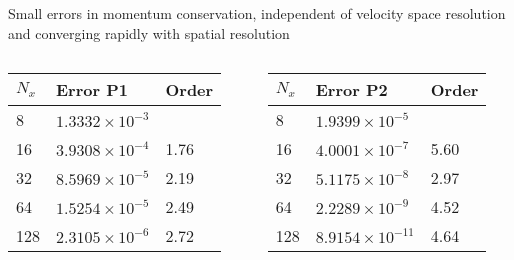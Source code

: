\documentclass[pdf]{beamer}
\theoremstyle{definition}
\begin{document}
\begin{frame}{Small errors in momentum conservation, independent of
    velocity space resolution and converging rapidly with spatial
    resolution}%

  \begin{columns}
    \begin{column}{0.5\textwidth}
      \begin{tabulary}{\linewidth}{|L|L|L|}
        \hline
        
          $N_x$
        & {
          Error P1
        } & {
          Order
        }\\
        & 
        $1.3332\times 10^{-3}$
        &  
        \\\hline
        
        16
        & 
        $3.9308\times 10^{-4}$
        & 
        1.76
        \\\hline
        
        32
        & 
        $8.5969\times 10^{-5}$
        & 
        2.19
        \\\hline
        
        64
        & 
        $1.5254\times 10^{-5}$
        & 
        2.49
        \\\hline
        
        128
        & 
        $2.3105\times 10^{-6}$
        & 
        2.72
        \\\hline
      \end{tabulary}
    \end{column}
    \begin{column}{0.5\textwidth}
      \begin{tabulary}{\linewidth}{|L|L|L|}
        \hline
        $N_x$
        & {
          Error P2
        } & {
          Order
        }\\
        & 
        $1.9399\times 10^{-5}$
        &  
        \\\hline
        
        16
        & 
        $4.0001\times 10^{-7}$
        & 
        5.60
        \\\hline
        
        32
        & 
        $5.1175\times 10^{-8}$
        & 
        2.97
        \\\hline

        64
        & 
        $2.2289\times 10^{-9}$
        & 
        4.52
        \\\hline

        128
        & 
        $8.9154\times 10^{-11}$
        & 
        4.64
        \\\hline
      \end{tabulary}
    \end{column}
  \end{columns}

\end{frame}
\end{document}
